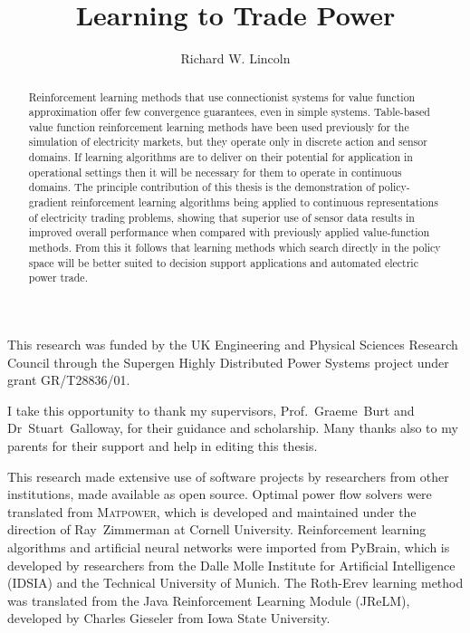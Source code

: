 \documentclass[12pt]{strath_thesis}
\title{Learning to Trade Power}
\author{Richard W. Lincoln}
\begin{document}
\maketitle

\setcounter{page}{1}

\declaration

\begin{acknowledgements}
This research was funded by the UK Engineering and Physical Sciences Research
Council through the Supergen Highly Distributed Power Systems project under
grant GR/T28836/01.

I take this opportunity to thank my supervisors, Prof.~Graeme~Burt and
Dr~Stuart~Galloway, for their guidance and scholarship.  Many thanks also to
my parents for their support and help in editing this thesis.

This research made extensive use of software projects by researchers from other
institutions, made available as open source.  Optimal power flow solvers
were translated from \textsc{Matpower}, which is developed and maintained under the
direction of Ray~Zimmerman at Cornell University.  Reinforcement learning
algorithms and artificial neural networks were imported from PyBrain, which is
developed by researchers from the Dalle Molle Institute for Artificial
Intelligence (IDSIA) and the Technical University of Munich.  The Roth-Erev
learning method was translated from the Java Reinforcement Learning Module
(JReLM), developed by Charles Gieseler from Iowa State University.
\end{acknowledgements}

\begin{abstract}
Reinforcement learning methods that use connectionist systems for value
function approximation offer few convergence guarantees, even in simple
systems.  Table-based value function reinforcement learning methods have been
used previously for the simulation of electricity markets, but they operate
only in discrete action and sensor domains.  If learning algorithms are to
deliver on their potential for application in operational settings then it will
be necessary for them to operate in continuous domains.  The principle
contribution of this thesis is the demonstration of policy-gradient
reinforcement learning algorithms being applied to continuous representations
of electricity trading problems, showing that superior use of sensor data
results in improved overall performance when compared with previously applied
value-function methods.  From this it follows that learning methods which
search directly in the policy space will be better suited to decision support
applications and automated electric power trade.
\end{abstract}
\end{document}

